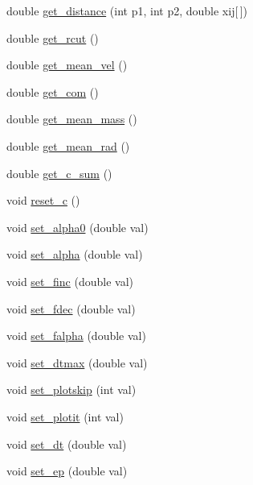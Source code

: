 \begin{DoxyCompactItemize}
\item 
double \mbox{\hyperlink{classpacking_a79d854d4f45683e8a11652ce90676a90}{get\+\_\+distance}} (int p1, int p2, double xij\mbox{[}$\,$\mbox{]})
\item 
double \mbox{\hyperlink{classpacking_a9485b9495dbedd5d954bade26a3033b7}{get\+\_\+rcut}} ()
\item 
double \mbox{\hyperlink{classpacking_a72af770ca74d1b7cf93301210b4aee63}{get\+\_\+mean\+\_\+vel}} ()
\item 
double \mbox{\hyperlink{classpacking_a654616abad6b4e39903bf1c2f4953c8a}{get\+\_\+com}} ()
\item 
double \mbox{\hyperlink{classpacking_aed06b7bd33506e2e26fd4b95749873a8}{get\+\_\+mean\+\_\+mass}} ()
\item 
double \mbox{\hyperlink{classpacking_ace5de1e50143754b63f3922ed9dcd646}{get\+\_\+mean\+\_\+rad}} ()
\item 
double \mbox{\hyperlink{classpacking_a23fc5018721f5022318addbe87b33d47}{get\+\_\+c\+\_\+sum}} ()
\item 
void \mbox{\hyperlink{classpacking_aa6f391cfee43bbb59dc71221a23c8d83}{reset\+\_\+c}} ()
\item 
void \mbox{\hyperlink{classpacking_a33a628e0d2d7bcaa72f6a205a3244e76}{set\+\_\+alpha0}} (double val)
\item 
void \mbox{\hyperlink{classpacking_aa80ff9c4b9ec36807a0d42ce28f50d2a}{set\+\_\+alpha}} (double val)
\item 
void \mbox{\hyperlink{classpacking_a8cb03b2d0af8408ba4c590ade7c738ca}{set\+\_\+finc}} (double val)
\item 
void \mbox{\hyperlink{classpacking_aaa7a1eb80bdf6f80a8d91415e4e03e69}{set\+\_\+fdec}} (double val)
\item 
void \mbox{\hyperlink{classpacking_af80acfd978be8d09fed22d40459bb3fc}{set\+\_\+falpha}} (double val)
\item 
void \mbox{\hyperlink{classpacking_a5dc1a61832b80ca41be310784cec6008}{set\+\_\+dtmax}} (double val)
\item 
void \mbox{\hyperlink{classpacking_a9c34cb0d24ff7bf013c19f801591c646}{set\+\_\+plotskip}} (int val)
\item 
void \mbox{\hyperlink{classpacking_a9bfa5637ac07f61d5cd34655c3a36455}{set\+\_\+plotit}} (int val)
\item 
void \mbox{\hyperlink{classpacking_a2d86b4b1188bd7d3c9b13dacbb0ca2fb}{set\+\_\+dt}} (double val)
\item 
void \mbox{\hyperlink{classpacking_a3371ec250e3165eae9231914a7e7fa88}{set\+\_\+ep}} (double val)

\end{DoxyCompactItemize}
